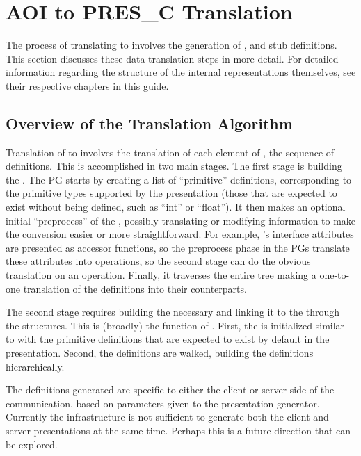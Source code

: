\section{AOI to PRES\_C Translation}
\label{sec:PG:AOI to PRESC Translation}

The process of translating \AOI{} to \PRESC{} involves the generation of
\MINT{}, \CAST{} and stub definitions.  This section discusses these data
translation steps in more detail.  For detailed information regarding the
structure of the internal representations themselves, see their respective
chapters in this guide.


\subsection{Overview of the Translation Algorithm}
\label{subsec:PG:Overview of the Translation Algorithm}

Translation of \AOI{} to \PRESC{} involves the translation of each element of
, the sequence of \AOI{} definitions.  This is
accomplished in two main stages.  The first stage is building the \MINT{}\@.
The PG starts by creating a list of ``primitive'' \MINT{} definitions,
corresponding to the primitive types supported by the presentation (those that
are expected to exist without being defined, such as ``int'' or ``float'').  It
then makes an optional initial ``preprocess'' of the \AOI{}, possibly
translating or modifying information to make the \PRESC{} conversion easier or
more straightforward.  For example, \CORBA{}'s interface attributes are
presented as accessor functions, so the preprocess phase in the \CORBA{} PGs
translate these attributes into operations, so the second stage can do the
obvious translation on an operation.  Finally, it traverses the entire \AOI{}
tree making a one-to-one translation of the \AOI{} definitions into their
\MINT{} counterparts.

The second stage requires building the necessary \CAST{} and linking it to the
\MINT{} through the \PRESC{} structures.  This is (broadly) the function of
.  First, the \CAST{} is initialized similar to
\MINT{} with the primitive definitions that are expected to exist by default in
the presentation.  Second, the \AOI{} definitions are walked, building the
\PRESC{} definitions hierarchically.

The \PRESC{} definitions generated are specific to either the client or server
side of the communication, based on parameters given to the presentation
generator.  Currently the infrastructure is not sufficient to generate both the
client and server presentations at the same time.  Perhaps this is a future
direction that can be explored.

